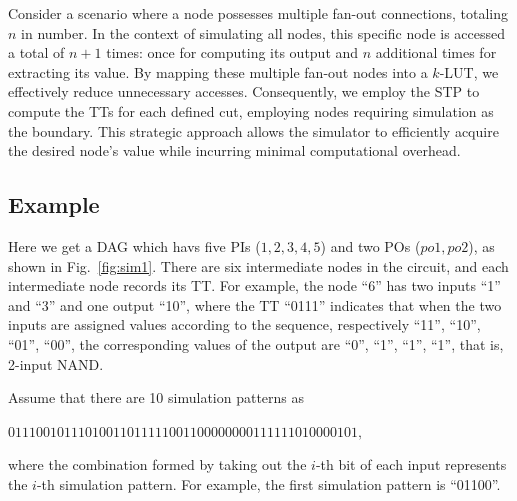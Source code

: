 \documentclass[conference]{IEEEtran}
\begin{document}
Consider a scenario where a node possesses multiple fan-out connections, totaling $n$ in number. 
In the context of simulating all nodes, this specific node is accessed a total of $n+1$ times: once for computing its output and $n$ additional times for extracting its value.
By mapping these multiple fan-out nodes into a $k$-LUT, we effectively reduce unnecessary accesses. 
Consequently, we employ the STP to compute the TTs for each defined cut, employing nodes requiring simulation as the boundary. This strategic approach allows the simulator to efficiently acquire the desired node's value while incurring minimal computational overhead.

\subsection{Example}
\label{sec34}
Here we get a DAG which havs five PIs ($1, 2, 3, 4, 5$) and two POs ($po1, po2$), as shown in Fig.~\ref{fig:sim1}.
There are six intermediate nodes in the circuit, and each intermediate node records its TT. 
For example, the node ``6'' has two inputs ``1'' and ``3'' and one output ``10'', where the TT ``0111'' indicates that when the two inputs are assigned values according to the sequence, respectively ``11'', ``10'', ``01'', ``00'', the corresponding values of the output are ``0'', ``1'', ``1'', ``1'', that is, 2-input NAND.

Assume that there are 10 simulation patterns as
\begin{center}
$01110010111010011011111001100000000111111010000101,$
\end{center}
where the combination formed by taking out the $i$-th bit of each input represents the $i$-th simulation pattern.
For example, the first simulation pattern is ``01100''.
\end{document}
